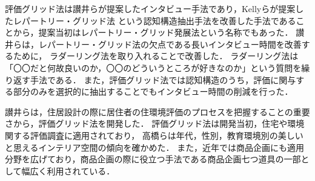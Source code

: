 \documentclass[syuuron]{kuee}
\begin{document}
		評価グリッド法は讃井らが提案したインタビュー手法であり，Kellyらが提案したレパートリー・グリッド法\cite{rg1}
		という認知構造抽出手法を改善した手法であることから，提案当初はレパートリー・グリッド発展法という名称でもあった．
		讃井らは，レパートリー・グリッド法の欠点である長いインタビュー時間を改善するために，
		ラダーリング法\cite{rd1}を取り入れることで改善した．
		ラダーリング法は「〇〇だと何故良いのか，〇〇のどういうところが好きなのか」という質問を繰り返す手法である．
		また，評価グリッド法では認知構造のうち，評価に関与する部分のみを選択的に抽出することでもインタビュー時間の削減を行った．
		
		讃井らは，住居設計の際に居住者の住環境評価のプロセスを把握することの重要さから，評価グリッド法を開発した．
		評価グリッド法は開発当初，住宅や環境関する評価調査に適用されており，
		高橋らは年代，性別，教育環境別の美しいと思えるインテリア空間の傾向を確かめた\cite{egm1}．
		また，近年では商品企画にも適用分野を広げており，商品企画の際に役立つ手法である商品企画七つ道具の一部として幅広く利用されている\cite{egm2}．
		
\end{document}
